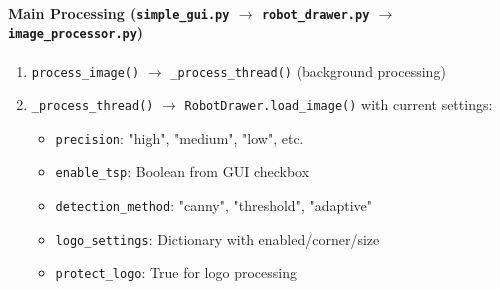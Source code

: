 \documentclass[a4paper,12pt]{article}
\begin{document}
\paragraph{Main Processing (\texttt{simple\_gui.py} $\rightarrow$ \texttt{robot\_drawer.py} $\rightarrow$ \texttt{image\_processor.py})}
\begin{enumerate}
\item \texttt{process\_image()} $\rightarrow$ \texttt{\_process\_thread()} (background processing)
\item \texttt{\_process\_thread()} $\rightarrow$ \texttt{RobotDrawer.load\_image()} with current settings:
	\begin{itemize}
	\item \texttt{precision}: "high", "medium", "low", etc.
	\item \texttt{enable\_tsp}: Boolean from GUI checkbox
	\item \texttt{detection\_method}: "canny", "threshold", "adaptive"
	\item \texttt{logo\_settings}: Dictionary with enabled/corner/size
	\item \texttt{protect\_logo}: True for logo processing
	\end{itemize}
\end{enumerate}
\end{document}
